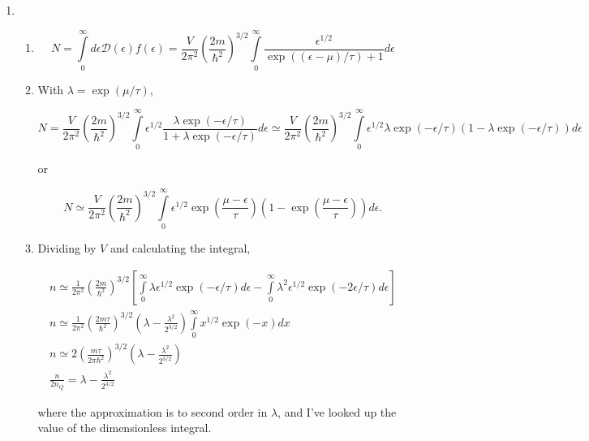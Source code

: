 \documentclass{article}
\begin{document}
\begin{enumerate}
\begin{enumerate}
	\end{enumerate}

	\item

	\begin{enumerate}

		\item

		$$N = \int \limits_0^\infty  d\epsilon \mathcal{D}(\epsilon) f(\epsilon) = \frac{V}{2\pi^2} \left( \frac{2m}{\hbar^2} \right)^{3/2} \int \limits_0^\infty \frac{\epsilon^{1/2}}{\exp((\epsilon - \mu)/\tau) + 1} d\epsilon$$

		\item

		With $\lambda = \exp(\mu/\tau)$,

		$$N = \frac{V}{2\pi^2} \left( \frac{2m}{\hbar^2} \right)^{3/2} \int \limits_0^\infty \epsilon^{1/2}\frac{ \lambda \exp(-\epsilon/\tau)}{1 + \lambda \exp(-\epsilon/\tau)} d\epsilon \simeq \frac{V}{2\pi^2} \left( \frac{2m}{\hbar^2} \right)^{3/2} \int \limits_0^\infty \epsilon^{1/2} \lambda \exp(-\epsilon/\tau) (1 - \lambda \exp(-\epsilon/\tau)) d\epsilon $$

		or

		$$N \simeq \frac{V}{2\pi^2} \left( \frac{2m}{\hbar^2} \right)^{3/2} \int \limits_0^\infty \epsilon^{1/2} \exp\left( \frac{\mu-\epsilon}{\tau} \right) \left(1 - \exp \left(\frac{\mu -\epsilon}{\tau}\right) \right) d\epsilon.$$

		\item

		Dividing by $V$ and calculating the integral,

		\begin{gather*}
		n \simeq \frac{1}{2\pi^2} \left( \frac{2m}{\hbar^2} \right)^{3/2} \left[ \int \limits_0^\infty  \lambda \epsilon^{1/2}\exp(-\epsilon/\tau) d\epsilon - \int \limits_0^\infty  \lambda^2 \epsilon^{1/2}\exp(-2\epsilon/\tau) d\epsilon \right] \\
		n \simeq \frac{1}{2\pi^2} \left( \frac{2m \tau}{\hbar^2} \right)^{3/2} \left(\lambda - \frac{\lambda^2}{2^{3/2}} \right) \int \limits_0^\infty x^{1/2}\exp(-x) dx  \\
		n \simeq 2 \left( \frac{m \tau}{2 \pi \hbar^2} \right)^{3/2}\left(\lambda - \frac{\lambda^2}{2^{3/2}} \right) \\
		\frac{n}{2n_Q} = \lambda - \frac{\lambda^2}{2^{3/2}}
		\end{gather*}

		where the approximation is to second order in $\lambda$, and I've looked up the value of the dimensionless integral.


\end{enumerate}
\end{enumerate}
\end{document}
